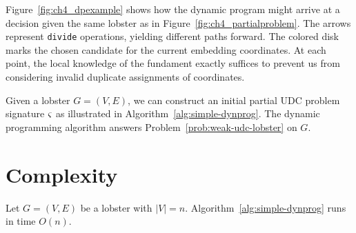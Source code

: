 Figure~\ref{fig:ch4_dpexample} shows how the dynamic program might arrive at a decision given the same lobster as in Figure~\ref{fig:ch4_partialproblem}. The arrows represent \texttt{divide} operations, yielding different paths forward. The colored disk marks the chosen candidate for the current embedding coordinates. At each point, the local knowledge of the fundament exactly suffices to prevent us from considering invalid duplicate assignments of coordinates.

Given a lobster $G = (V, E)$, we can construct an initial partial UDC problem signature $\varsigma$ as illustrated in Algorithm~\ref{alg:simple-dynprog}.
The dynamic programming algorithm answers Problem~\ref{prob:weak-udc-lobster} on $G$.\cite{Bhore2021}

\section{Complexity}

\begin{theorem}
Let $G = (V, E)$ be a lobster with $|V| = n$. Algorithm~\ref{alg:simple-dynprog} runs in time $O(n)$.
\end{theorem}

